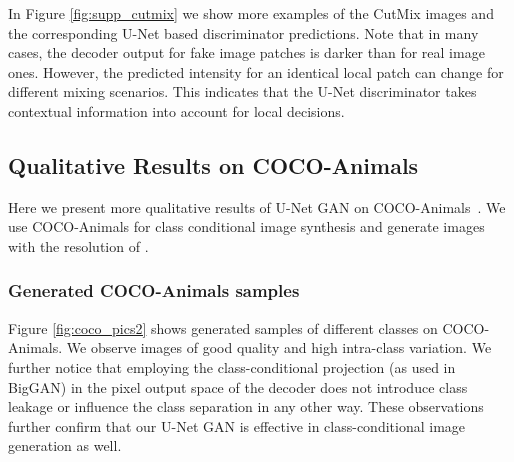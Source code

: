 \documentclass[10pt,twocolumn,letterpaper]{article}
\begin{document}
\begin{figure*}
\begin{centering}
\begin{tabular}{@{\hskip -0.2in}c@{ }c@{ }c@{ }c@{ }c@{ }c@{}c@{ }c@{ }c@{ }c@{ }c@{}}
				\end{tabular}


	\par\end{centering}

	\vspace{0.5em}

	\caption{\label{fig:supp_cutmix}  Visualization of the CutMix augmentation and the predictions of the U-Net discriminator on CutMix images. 1st row: real and fake samples. 2nd\&3rd rows: sampled real/fake CutMix ratio  and corresponding binary masks  (color code: white for real, black for fake). 4th row: generated CutMix images from real and fake samples. 5th\&6th row: the corresponding real/fake segmentation maps of the U-Net GAN decoder  with the corresponding predicted classification scores by the encoder  below. 
	 }
\end{figure*}
 In Figure \ref{fig:supp_cutmix} we show more examples of the CutMix images and the corresponding U-Net based discriminator  predictions. Note that in many cases, the decoder output for fake image patches is darker than for real image ones. However, the predicted intensity for an identical local patch can change for different mixing scenarios. This indicates that the U-Net discriminator takes contextual information into account for local decisions.

 \clearpage
\subsection{Qualitative Results on COCO-Animals}\label{sec:syn samples_coco}


Here we present more qualitative results of U-Net GAN on COCO-Animals~\cite{Lin2014MicrosoftCC,OpenImages}.
We use COCO-Animals for class conditional image synthesis and generate images with the resolution of .

\subsubsection*{Generated COCO-Animals samples}
Figure \ref{fig:coco_pics2} shows generated samples of different classes on COCO-Animals. We observe images of good quality and high intra-class variation. We further notice that employing the class-conditional projection (as used in BigGAN) in the pixel output space of the decoder does not introduce class leakage or influence the class separation in any other way. 
These observations further confirm that our U-Net GAN is effective in class-conditional image generation as well.
\end{document}
